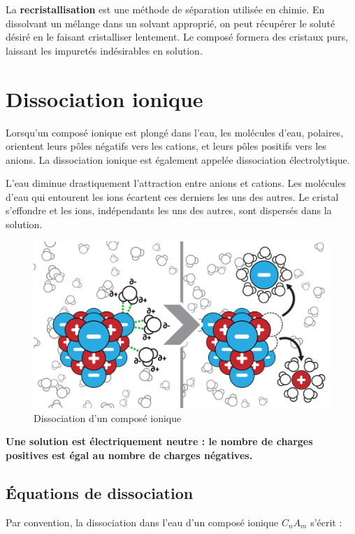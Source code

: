 \documentclass[
  11pt,
  french,
  a4paper,
  openany]{book}
\begin{document}
La \textbf{recristallisation} est une méthode de séparation utilisée en chimie. En dissolvant un mélange dans un solvant approprié, on peut récupérer le soluté désiré en le faisant cristalliser lentement. Le composé formera des cristaux purs, laissant les impuretés indésirables en solution.

\hypertarget{dissociation-ionique}{%
\section{Dissociation ionique}\label{dissociation-ionique}}

Lorsqu'un composé ionique est plongé dans l'eau, les molécules d'eau, polaires, orientent leurs pôles négatifs vers les cations, et leurs pôles positifs vers les anions. La dissociation ionique est également appelée dissociation électrolytique.

L'eau diminue drastiquement l'attraction entre anions et cations. Les molécules d'eau qui entourent les ions écartent ces derniers les uns des autres. Le cristal s'effondre et les ions, indépendants les uns des autres, sont dispersés dans la solution.

\begin{figure}

{\centering \includegraphics[width=0.5\linewidth]{images/dissociation} 

}

\caption{Dissociation d'un composé ionique}\label{fig:dissociation}
\end{figure}

\textbf{Une solution est électriquement neutre : le nombre de charges positives est égal au nombre de charges négatives.}

\hypertarget{uxe9quations-de-dissociation}{%
\subsection{Équations de dissociation}\label{uxe9quations-de-dissociation}}

Par convention, la dissociation dans l'eau d'un composé ionique \(C_nA_m\) s'écrit :
\end{document}
